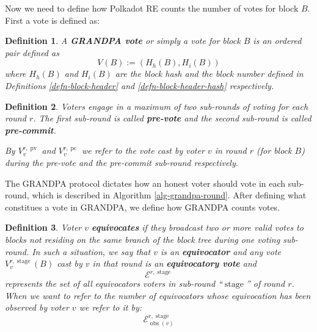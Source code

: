 \documentclass{article}
\newcommand{\assign}{:=}
\newcommand{\nosymbol}{}
\newcommand{\tmop}[1]{\ensuremath{\operatorname{#1}}}
\newcommand{\tmstrong}[1]{\textbf{#1}}
\newcommand{\tmtextbf}[1]{{\bfseries{#1}}}
\newcommand{\tmtexttt}[1]{{\ttfamily{#1}}}
\newcommand{\tmverbatim}[1]{{\ttfamily{#1}}}
\newtheorem{definition}{Definition}
\providecommand{\nosymbol}{}
\providecommand{\tmop}[1]{\ensuremath{\mathrm{#1}}}
\providecommand{\tmstrong}[1]{\tmtextbf{#1}}
\providecommand{\tmtextbf}[1]{\tmtextbf{#1}}
\providecommand{\tmverbatim}[1]{\tmtexttt{#1}}
\newtheorem{definition}{Definition}
\begin{document}
Now we need to define how Polkadot RE counts the number of votes for block
$B$. First a vote is defined as:

\begin{definition}
  \label{defn-vote}A {\tmstrong{GRANDPA vote }}or simply a vote for block $B$
  is an ordered pair defined as
  \[ V_{\nosymbol} (B) \assign (H_h (B), H_i (B)) \]
  where $H_h (B)$ and $H_i (B)$ are the block hash and the block number
  defined in Definitions \ref{defn-block-header} and
  \ref{defn-block-header-hash} respectively.
\end{definition}

\begin{definition}
  Voters engage in a maximum of two sub-rounds of voting for each round $r$.
  The first sub-round is called {\tmstrong{pre-vote}} and\tmverbatim{} the
  second sub-round is called {\tmstrong{pre-commit}}.
  
  By {\tmstrong{$V_v^{r, \tmop{pv}}$}} and {\tmstrong{$V_v^{r, \tmop{pc}}$}}
  we refer to the vote cast by voter $v$ in round $r$ (for block $B$) during
  the pre-vote and the pre-commit sub-round respectively.
\end{definition}

The GRANDPA protocol dictates how an honest voter should vote in each
sub-round, which is described in Algorithm \ref{alg-grandpa-round}. After
defining what constitues a vote in GRANDPA, we define how GRANDPA counts
votes.

\begin{definition}
  Voter $v$ {\tmstrong{equivocates}} if they broadcast two or more valid votes
  to blocks not residing on the same branch of the block tree during one
  voting sub-round. In such a situation, we say that $v$ is an
  {\tmstrong{equivocator}} and any vote $V_v^{r, \tmop{stage}} (B)$ cast by
  $v$ in that round is an {\tmstrong{equivocatory vote}} and
  \[ \mathcal{E}^{r, \tmop{stage}} \]
  represents the set of all equivocators voters in sub-round
  ``$\tmop{stage}$'' of round $r$. When we want to refer to the number
  of\tmverbatim{} equivocators whose equivocation has been observed by voter
  $v$ we refer to it by:
  \[ \mathcal{E}^{r, \tmop{stage}}_{\tmop{obs} (v)} \]
  
\end{definition}
\end{document}
